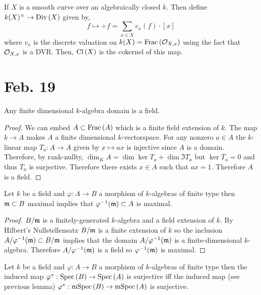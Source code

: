 \documentclass[12pt]{article}
\begin{document}
\begin{proposition}
If $X$ is a smooth curve over an algebraically closed $k$. Then define $k(X)^\times \to \mathrm{Div}\left( X \right)$ given by,
\[ f \mapsto \div{f} = \sum_{x \in X} v_x(f) \cdot [x] \]
where $v_x$ is the discrete valuation on $k(X) = \mathrm{Frac}\left(\mathcal{O}_{X, x}\right)$ using the fact that $\mathcal{O}_{X, x}$ is a DVR. Then, $\mathrm{Cl} \left( X \right)$ is the cokernel of this map.  
\end{proposition}

\section{Feb. 19}

\begin{lemma}
Any finite dimensional $k$-algebra domain is a field.
\end{lemma}

\begin{proof}
We can embed $A \subset \mathrm{Frac}\left(A\right)$ which is a finite field extension of $k$. The map $k \to A$ makes $A$ a finite dimensional $k$-vectorspace. For any nonzero $a \in A$ the $k$-linear map $T_a : A \to A$ given by $x \mapsto ax$ is injective since $A$ is a domain. Therefore, by rank-nullty, $\dim_{K}{A} = \dim{\ker{T_a}} + \dim{\Im{T_a}}$ but $\ker{T_a} = 0$ and thus $T_a$ is surjective. Therefore there exists $x \in A$ such that $ax = 1$. Therefore $A$ is a field. 
\end{proof}

\begin{lemma}
Let $k$ be a field and $\varphi : A \to B$ a morphism of $k$-algebras of finite type then $\mathfrak{m} \subset B$ maximal implies that $\varphi^{-1}(\mathfrak{m}) \subset A$ is maximal.
\end{lemma}

\begin{proof}
$B / \mathfrak{m}$ is a finitely-generated $k$-algebra and a field extension of $k$. By Hilbert's Nullstellensatz $B / \mathfrak{m}$ is a finite extension of $k$ so the inclusion $A / \varphi^{-1}(\mathfrak{m}) \subset B / \mathfrak{m}$ implies that the domain $A / \varphi^{-1}(\mathfrak{m})$ is a finite-dimensional $k$-algebra. Therefore $A / \varphi^{-1}(\mathfrak{m})$ is a field so $\varphi^{-1}(\mathfrak{m})$ is maximal.  
\end{proof}

\begin{lemma}
Let $k$ be a field and $\varphi : A \to B$ a morphism of $k$-algebras of finite type then the induced map $\varphi^* : \mathrm{Spec}\left( B \right) \to \mathrm{Spec}\left( A \right)$ is surjective iff the induced map (see previous lemma) $\varphi^* : \mathrm{mSpec}\left( B \right) \to \mathrm{mSpec}\left( A \right)$ is surjective. 
\end{lemma}
\end{document}
